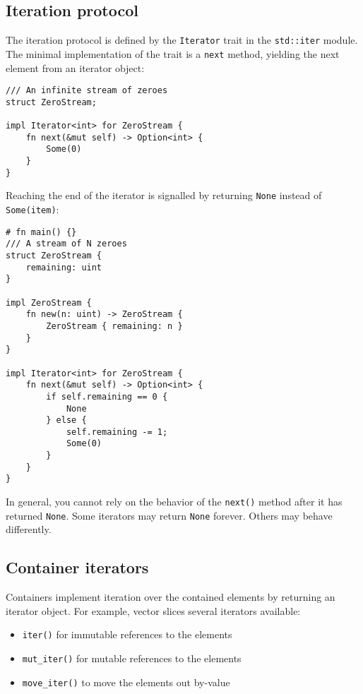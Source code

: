 \documentclass[]{article}
\begin{document}
\subsection{Iteration protocol}\label{iteration-protocol}

The iteration protocol is defined by the \texttt{Iterator} trait in the
\texttt{std::iter} module. The minimal implementation of the trait is a
\texttt{next} method, yielding the next element from an iterator object:

\begin{verbatim}
/// An infinite stream of zeroes
struct ZeroStream;

impl Iterator<int> for ZeroStream {
    fn next(&mut self) -> Option<int> {
        Some(0)
    }
}
\end{verbatim}

Reaching the end of the iterator is signalled by returning \texttt{None}
instead of \texttt{Some(item)}:

\begin{verbatim}
# fn main() {}
/// A stream of N zeroes
struct ZeroStream {
    remaining: uint
}

impl ZeroStream {
    fn new(n: uint) -> ZeroStream {
        ZeroStream { remaining: n }
    }
}

impl Iterator<int> for ZeroStream {
    fn next(&mut self) -> Option<int> {
        if self.remaining == 0 {
            None
        } else {
            self.remaining -= 1;
            Some(0)
        }
    }
}
\end{verbatim}

In general, you cannot rely on the behavior of the \texttt{next()}
method after it has returned \texttt{None}. Some iterators may return
\texttt{None} forever. Others may behave differently.

\subsection{Container iterators}\label{container-iterators}

Containers implement iteration over the contained elements by returning
an iterator object. For example, vector slices several iterators
available:

\begin{itemize}
\itemsep1pt\parskip0pt
\item
  \texttt{iter()} for immutable references to the elements
\item
  \texttt{mut\_iter()} for mutable references to the elements
\item
  \texttt{move\_iter()} to move the elements out by-value
\end{itemize}
\end{document}
